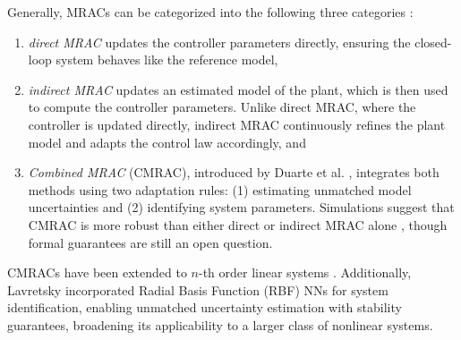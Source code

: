 Generally, MRACs can be categorized into the following three categories \cite{astromHistoryAdaptiveControl2014}:
\begin{enumerate}
    \item \textit{direct MRAC} updates the controller parameters directly, ensuring the closed-loop system behaves like the reference model,
    \item \textit{indirect MRAC} updates an estimated model of the plant, which is then used to compute the controller parameters. Unlike direct MRAC, where the controller is updated directly, indirect MRAC continuously refines the plant model and adapts the control law accordingly, and
    \item \textit{Combined MRAC} (CMRAC), introduced by Duarte et al. \cite{duarteCombinedDirectIndirect1989}, integrates both methods using two adaptation rules: (1) estimating unmatched model uncertainties and (2) identifying system parameters. Simulations suggest that CMRAC is more robust than either direct or indirect MRAC alone \cite{narendraRobustAdaptiveControl1988}, though formal guarantees are still an open question.
\end{enumerate}

CMRACs have been extended to $n$-th order linear systems \cite{lavretskyRobustAdaptiveControl2013, taoAdaptiveControlSystems2013}. Additionally, Lavretsky \cite{lavretskyCombinedCompositeModel2009} incorporated Radial Basis Function (RBF) NNs for system identification, enabling unmatched uncertainty estimation with stability guarantees, broadening its applicability to a larger class of nonlinear systems.




